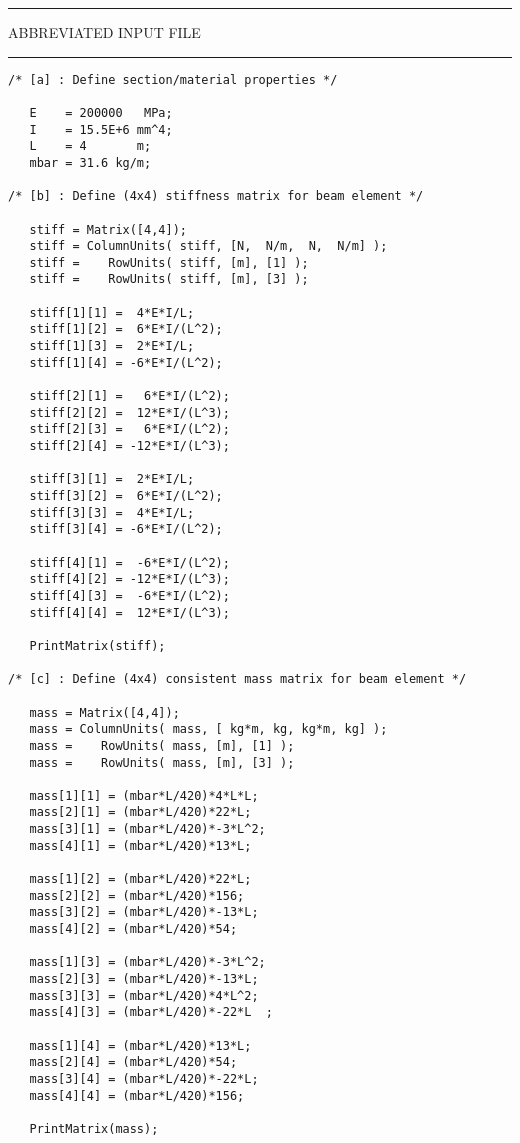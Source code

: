 \vspace{0.15 in}
\begin{footnotesize}
\noindent
{\rule{2.2 in}{0.035 in} ABBREVIATED INPUT FILE \rule{2.2 in}{0.035 in} }
\begin{verbatim}
/* [a] : Define section/material properties */

   E    = 200000   MPa;
   I    = 15.5E+6 mm^4;
   L    = 4       m;
   mbar = 31.6 kg/m;

/* [b] : Define (4x4) stiffness matrix for beam element */

   stiff = Matrix([4,4]);
   stiff = ColumnUnits( stiff, [N,  N/m,  N,  N/m] );
   stiff =    RowUnits( stiff, [m], [1] );
   stiff =    RowUnits( stiff, [m], [3] );

   stiff[1][1] =  4*E*I/L;
   stiff[1][2] =  6*E*I/(L^2);
   stiff[1][3] =  2*E*I/L;
   stiff[1][4] = -6*E*I/(L^2);

   stiff[2][1] =   6*E*I/(L^2);
   stiff[2][2] =  12*E*I/(L^3);
   stiff[2][3] =   6*E*I/(L^2);
   stiff[2][4] = -12*E*I/(L^3);

   stiff[3][1] =  2*E*I/L;
   stiff[3][2] =  6*E*I/(L^2);
   stiff[3][3] =  4*E*I/L;
   stiff[3][4] = -6*E*I/(L^2);

   stiff[4][1] =  -6*E*I/(L^2);
   stiff[4][2] = -12*E*I/(L^3);
   stiff[4][3] =  -6*E*I/(L^2);  
   stiff[4][4] =  12*E*I/(L^3);

   PrintMatrix(stiff);

/* [c] : Define (4x4) consistent mass matrix for beam element */

   mass = Matrix([4,4]);
   mass = ColumnUnits( mass, [ kg*m, kg, kg*m, kg] );
   mass =    RowUnits( mass, [m], [1] );
   mass =    RowUnits( mass, [m], [3] ); 

   mass[1][1] = (mbar*L/420)*4*L*L;
   mass[2][1] = (mbar*L/420)*22*L;
   mass[3][1] = (mbar*L/420)*-3*L^2;
   mass[4][1] = (mbar*L/420)*13*L;

   mass[1][2] = (mbar*L/420)*22*L;
   mass[2][2] = (mbar*L/420)*156;
   mass[3][2] = (mbar*L/420)*-13*L;
   mass[4][2] = (mbar*L/420)*54;

   mass[1][3] = (mbar*L/420)*-3*L^2;
   mass[2][3] = (mbar*L/420)*-13*L;
   mass[3][3] = (mbar*L/420)*4*L^2;
   mass[4][3] = (mbar*L/420)*-22*L  ;

   mass[1][4] = (mbar*L/420)*13*L;
   mass[2][4] = (mbar*L/420)*54;
   mass[3][4] = (mbar*L/420)*-22*L;
   mass[4][4] = (mbar*L/420)*156;

   PrintMatrix(mass);


\end{verbatim}
\end{footnotesize}
